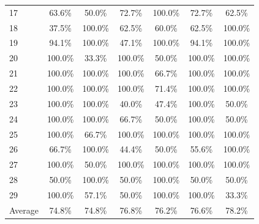 \begin{longtable}{lcc|cc|cc}
17 & 63.6\% & 50.0\% & 72.7\% & 100.0\% & 72.7\% & 62.5\% \\
18 & 37.5\% & 100.0\% & 62.5\% & 60.0\% & 62.5\% & 100.0\% \\
19 & 94.1\% & 100.0\% & 47.1\% & 100.0\% & 94.1\% & 100.0\% \\
20 & 100.0\% & 33.3\% & 100.0\% & 50.0\% & 100.0\% & 100.0\% \\
21 & 100.0\% & 100.0\% & 100.0\% & 66.7\% & 100.0\% & 100.0\% \\
22 & 100.0\% & 100.0\% & 100.0\% & 71.4\% & 100.0\% & 100.0\% \\
23 & 100.0\% & 100.0\% & 40.0\% & 47.4\% & 100.0\% & 50.0\% \\
24 & 100.0\% & 100.0\% & 66.7\% & 50.0\% & 100.0\% & 50.0\% \\
25 & 100.0\% & 66.7\% & 100.0\% & 100.0\% & 100.0\% & 100.0\% \\
26 & 66.7\% & 100.0\% & 44.4\% & 50.0\% & 55.6\% & 100.0\% \\
27 & 100.0\% & 50.0\% & 100.0\% & 100.0\% & 100.0\% & 100.0\% \\
28 & 50.0\% & 100.0\% & 50.0\% & 100.0\% & 50.0\% & 50.0\% \\
29 & 100.0\% & 57.1\% & 50.0\% & 100.0\% & 100.0\% & 33.3\% \\
\midrule
Average & 74.8\% & 74.8\% & 76.8\% & 76.2\% & 76.6\% & 78.2\% \\
\end{longtable}
